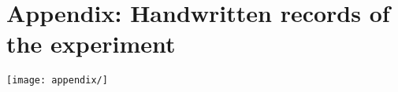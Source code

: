 \section{Appendix: Handwritten records of the experiment}
\label{sec:records}
    \texttt{[image: appendix/]}
\clearpage

